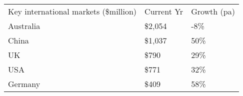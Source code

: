 \begin{tabular}[t]{p{5.1cm}>{\hfill}p{1.1cm}>{\hfill}p{1.3cm}}
 Key international markets (\$million) & Current Yr & Growth (pa) \\ 
 Australia & \$2,054 & -8\% \\ 
  China & \$1,037 & 50\% \\ 
  UK & \$790   & 29\% \\ 
  USA & \$771   & 32\% \\ 
  Germany & \$409   & 58\% \\ 
  \end{tabular}
